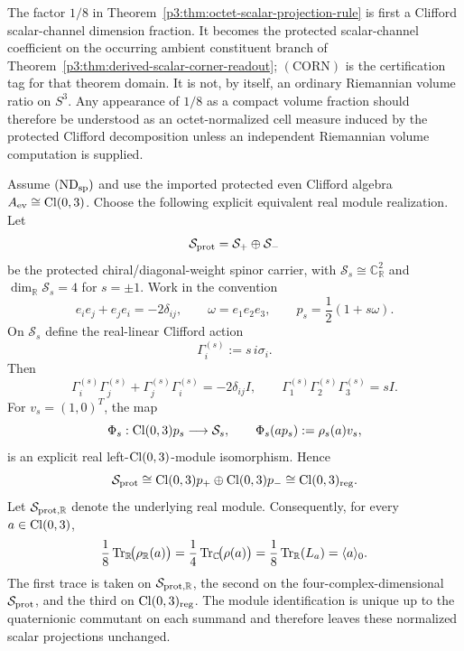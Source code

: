 \documentclass[12pt,a4paper]{article}
\begin{document}
\begin{remark}
The factor $1/8$ in
Theorem~\ref{p3:thm:octet-scalar-projection-rule} is first a
Clifford scalar-channel dimension fraction.  It becomes the protected
scalar-channel coefficient on the occurring ambient constituent branch of
Theorem~\ref{p3:thm:derived-scalar-corner-readout}; \((\mathrm{CORN})\) is
the certification tag for that theorem domain.
It is not, by itself, an ordinary Riemannian volume ratio on $S^3$. Any
appearance of $1/8$ as a compact volume fraction should therefore be
understood as an octet-normalized cell measure induced by the protected
Clifford decomposition unless an independent Riemannian volume computation
is supplied.
\end{remark}

\begin{theorem}
\label{p3:thm:regular-module-two-eights}
Assume \((\mathrm{ND}_{\rm sp})\) and use the imported protected even Clifford algebra \(A_{\rm ev}\cong\operatorname{Cl}(0,3)\).  Choose the following explicit equivalent real module realization.  Let
\[
\mathcal S_{\rm prot}=\mathcal S_+\oplus\mathcal S_-
\]
be the protected chiral/diagonal-weight spinor carrier, with
\(\mathcal S_s\cong\mathbb C^2_{\mathbb R}\) and
\(\dim_{\mathbb R}\mathcal S_s=4\) for \(s=\pm1\).  Work in the convention
\[
 e_i e_j+e_j e_i=-2\delta_{ij},
 \qquad \omega=e_1e_2e_3,
 \qquad p_s=\frac12(1+s\omega).
\]
On \(\mathcal S_s\) define the real-linear Clifford action
\[
 \Gamma_i^{(s)}:=s\,i\sigma_i .
\]
Then
\[
 \Gamma_i^{(s)}\Gamma_j^{(s)}+\Gamma_j^{(s)}\Gamma_i^{(s)}
 =-2\delta_{ij}I,
 \qquad
 \Gamma_1^{(s)}\Gamma_2^{(s)}\Gamma_3^{(s)}=sI.
\]
For \(v_s=(1,0)^T\), the map
\begin{equation}
\label{p3:eq:explicit-clifford-intertwiner}
 \Phi_s:\operatorname{Cl}(0,3)p_s\longrightarrow\mathcal S_s,
 \qquad
 \Phi_s(ap_s):=\rho_s(a)v_s,
\end{equation}
is an explicit real left-\(\operatorname{Cl}(0,3)\)-module isomorphism.  Hence
\begin{equation}
\label{p3:eq:protected-carrier-regular-clifford-module}
 \mathcal S_{\rm prot}
 \cong
 \operatorname{Cl}(0,3)p_+\oplus\operatorname{Cl}(0,3)p_-
 \cong
 \operatorname{Cl}(0,3)_{\rm reg}.
\end{equation}
Let \(\mathcal S_{{\rm prot},\mathbb R}\) denote the underlying real
module.  Consequently, for every \(a\in\operatorname{Cl}(0,3)\),
\begin{equation}
\label{p3:eq:protected-carrier-trace-scalar-projection}
 \frac18\operatorname{Tr}_{\mathbb R}\!\bigl(\rho_{\mathbb R}(a)\bigr)
 =\frac14\operatorname{Tr}_{\mathbb C}\!\bigl(\rho(a)\bigr)
 =\frac18\operatorname{Tr}_{\mathbb R}(L_a)
 =\langle a\rangle_0.
\end{equation}
The first trace is taken on \(\mathcal S_{{\rm prot},\mathbb R}\), the
second on the four-complex-dimensional \(\mathcal S_{\rm prot}\), and the
third on \(\operatorname{Cl}(0,3)_{\rm reg}\).  The module identification is unique up to
the quaternionic commutant on each summand and therefore leaves these
normalized scalar projections unchanged.
\end{theorem}
\end{document}
